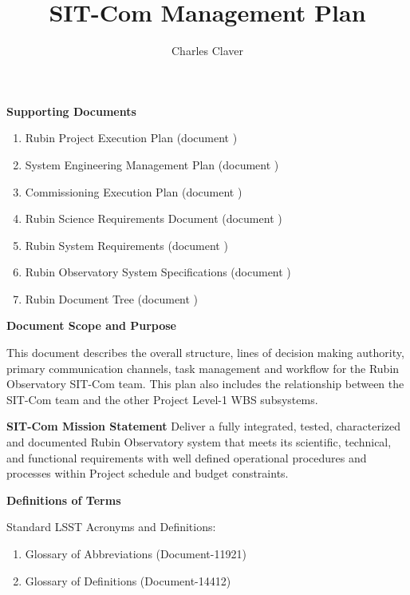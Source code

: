 \documentclass[SE,lsstdraft,authoryear,toc]{lsstdoc}
\title{SIT-Com Management Plan}
\author{%
Charles Claver
}
\date{\vcsDate}
\begin{document}
\maketitle


\textbf{Supporting Documents}

    \begin{enumerate}
        \item Rubin Project Execution Plan (document )

        \item System Engineering Management Plan (document )

        \item Commissioning Execution Plan (document )

        \item Rubin Science Requirements Document (document )

        \item Rubin System Requirements (document )

        \item Rubin Observatory System Specifications (document )

        \item Rubin Document Tree (document )

    \end{enumerate}

\textbf{Document Scope and Purpose}
\label{sec:Scope}

This document describes the overall structure, lines of decision making authority, primary communication channels, task management and workflow for the Rubin Observatory SIT-Com team.
This plan also includes the relationship between the SIT-Com team and the other Project Level-1 WBS subsystems.

\textbf{SIT-Com Mission Statement}
Deliver a fully integrated, tested, characterized and documented Rubin Observatory system that meets its scientific, technical, and functional requirements with well defined operational procedures and processes within Project schedule and budget constraints.

\textbf{Definitions of Terms}

Standard LSST Acronyms and Definitions:
\begin{enumerate}
    \item Glossary of Abbreviations (Document-11921)
    \item Glossary of Definitions (Document-14412)
\end{enumerate}
\end{document}
